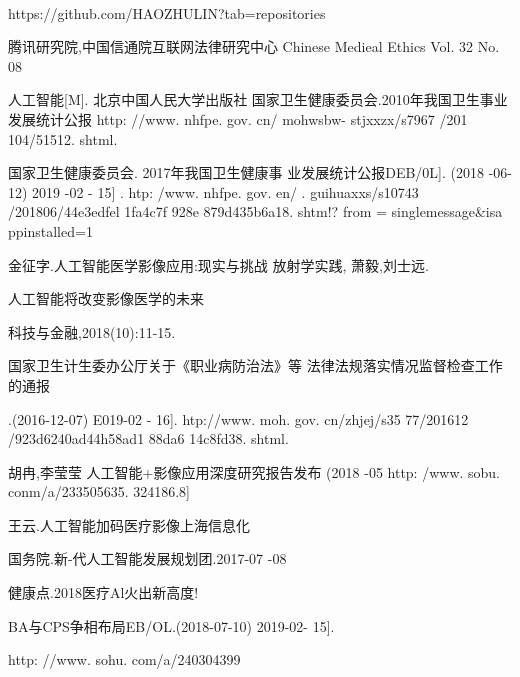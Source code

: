\documentclass{article}
\begin{document}
\hspace*{\fill} \\



https://github.com/HAOZHULIN?tab=repositories





\par
 腾讯研究院,中国信通院互联网法律研究中心
Chinese Medieal Ethics	Vol. 32 No. 08\par


人工智能[M]. 北京中国人民大学出版社
 国家卫生健康委员会.2010年我国卫生事业发展统计公报
 http: //www. nhfpe. gov. cn/ mohwsbw-
stjxxzx/s7967 /201 104/51512. shtml.\par


国家卫生健康委员会. 2017年我国卫生健康事
业发展统计公报DEB/0L]. (2018 -06- 12)
2019 -02 - 15] . htp: /www. nhfpe. gov. en/ .
guihuaxxs/s10743 /201806/44e3edfel 1fa4c7f 928e
879d435b6a18. shtm!? from = singlemessage\&isa ppinstalled=1\par


金征字.人工智能医学影像应用:现实与挑战
放射学实践, 萧毅,刘士远.\par


人工智能将改变影像医学的未来\par

科技与金融,2018(10):11-15.\par

 国家卫生计生委办公厅关于《职业病防治法》等
法律法规落实情况监督检查工作的通报\par
[EB/0I].(2016-12-07) E019-02 - 16].
 htp://www. moh. gov. cn/zhjej/s35 77/201612 /923d6240ad44h58ad1 88da6 14c8fd38. shtml.\par
 
 
胡冉,李莹莹 人工智能+影像应用深度研究报告发布 (2018 -05 
 http: /www. sobu. conm/a/233505635. 324186.8]\par
 
 
  王云.人工智能加码医疗影像上海信息化\par
  
  
 国务院.新-代人工智能发展规划团.2017-07 -08\par
 
 
健康点.2018医疗Al火出新高度!\par


 BA与CPS争相布局EB/OL.(2018-07-10) 2019-02- 15].\par
 http: //www. sohu. com/a/240304399\par
 
\end{document}
